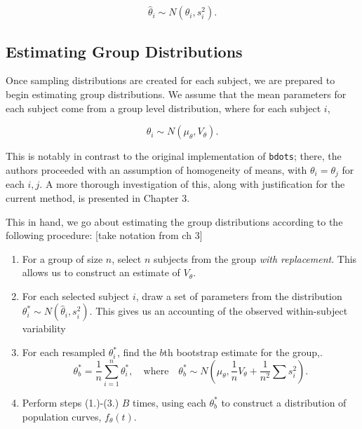 \documentclass{article}
\newcommand{\xt}{\texttt}%
\begin{document}
\begin{equation}
\hat{\theta}_i \sim N(\theta_i, s_i^2).
\end{equation}

\subsection{Estimating Group Distributions}\label{sec:group_dist}

Once sampling distributions are created for each subject, we are prepared to begin estimating group distributions. We assume that the mean parameters for each subject come from a group level distribution, where for each subject $i$,

\begin{equation}
\theta_i \sim N(\mu_{\theta}, V_{\theta}).
\end{equation}

This is notably in contrast to the original implementation of \xt{bdots}; there, the authors proceeded with an assumption of homogeneity of means, with $\theta_i = \theta_j$ for each $i, j$. A more thorough investigation of this, along with justification for the current method, is presented in Chapter 3.

This in hand, we go about estimating the group distributions according to the following procedure: [take notation from ch 3]


\begin{enumerate}
\item For a group of size $n$, select $n$ subjects from the group \textit{with replacement}. This allows us to construct an estimate of $V_{\theta}$.
\item For each selected subject $i$, draw a set of parameters from the distribution $\theta_{i}^* \sim N(\hat{\theta}_i, s_i^2)$. This gives us an accounting of the observed within-subject variability
\item For each resampled $\theta_i^*$, find the $b$th bootstrap estimate for the group,.
\begin{equation}
\theta_b^* = \frac1n \sum_{i=1}^n \theta_i^*, \quad \text{where} \quad \theta_b^* \sim N  \left(\mu_{\theta}, \frac1n V_{\theta} + \frac{1}{n^2}\sum s_i^2 \right).
\end{equation}
\item Perform steps (1.)-(3.) $B$ times, using each $\theta_b^*$ to construct a distribution of population curves, $f_{\theta}(t)$.
\end{enumerate}
\end{document}
